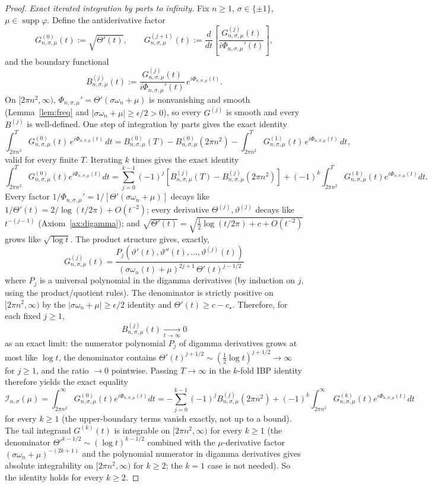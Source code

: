 \documentclass[11pt]{article}
\theoremstyle{definition}
\newcommand{\supp}{\operatorname{supp}}
\begin{document}
\begin{proof}
\emph{Exact iterated integration by parts to infinity.} Fix \(n\ge 1\), \(\sigma\in\{\pm 1\}\), \(\mu\in\supp\varphi\). Define the antiderivative factor
\[
G_{n,\sigma,\mu}^{(0)}(t):=\sqrt{\Theta'(t)},\qquad G_{n,\sigma,\mu}^{(j+1)}(t):=\frac{d}{dt}\!\left[\frac{G_{n,\sigma,\mu}^{(j)}(t)}{i\Phi_{n,\sigma,\mu}'(t)}\right],
\]
and the boundary functional
\[
B_{n,\sigma,\mu}^{(j)}(t):=\frac{G_{n,\sigma,\mu}^{(j)}(t)}{i\Phi_{n,\sigma,\mu}'(t)}\,e^{i\Phi_{n,\sigma,\mu}(t)}.
\]
On \([2\pi n^2,\infty)\), \(\Phi_{n,\sigma,\mu}'=\Theta'(\sigma\omega_n+\mu)\) is nonvanishing and smooth (Lemma~\ref{lem:freq} and \(|\sigma\omega_n+\mu|\ge\epsilon/2>0\)), so every \(G^{(j)}\) is smooth and every \(B^{(j)}\) is well-defined. One step of integration by parts gives the exact identity
\[
\int_{2\pi n^2}^T G_{n,\sigma,\mu}^{(0)}(t)\,e^{i\Phi_{n,\sigma,\mu}(t)}\,dt=B_{n,\sigma,\mu}^{(0)}(T)-B_{n,\sigma,\mu}^{(0)}(2\pi n^2)-\int_{2\pi n^2}^T G_{n,\sigma,\mu}^{(1)}(t)\,e^{i\Phi_{n,\sigma,\mu}(t)}\,dt,
\]
valid for every finite \(T\). Iterating \(k\) times gives the exact identity
\[
\int_{2\pi n^2}^T G_{n,\sigma,\mu}^{(0)}(t)e^{i\Phi_{n,\sigma,\mu}(t)}dt=\sum_{j=0}^{k-1}(-1)^j\!\left[B_{n,\sigma,\mu}^{(j)}(T)-B_{n,\sigma,\mu}^{(j)}(2\pi n^2)\right]+(-1)^k\!\int_{2\pi n^2}^T G_{n,\sigma,\mu}^{(k)}(t)e^{i\Phi_{n,\sigma,\mu}(t)}dt.
\]
Every factor \(1/\Phi_{n,\sigma,\mu}'=1/[\Theta'(\sigma\omega_n+\mu)]\) decays like \(1/\Theta'(t)=2/\log(t/2\pi)+O(t^{-2})\); every derivative \(\Theta^{(j)},\vartheta^{(j)}\) decays like \(t^{-(j-1)}\) (Axiom~\ref{ax:digamma}); and \(\sqrt{\Theta'(t)}=\sqrt{\tfrac12\log(t/2\pi)+c+O(t^{-2})}\) grows like \(\sqrt{\log t}\). The product structure gives, exactly,
\[
G_{n,\sigma,\mu}^{(j)}(t)=\frac{P_j(\vartheta'(t),\vartheta''(t),\ldots,\vartheta^{(j)}(t))}{(\sigma\omega_n(t)+\mu)^{2j+1}\,\Theta'(t)^{j-1/2}}
\]
where \(P_j\) is a universal polynomial in the digamma derivatives (by induction on \(j\), using the product/quotient rules). The denominator is strictly positive on \([2\pi n^2,\infty)\) by the \(|\sigma\omega_n+\mu|\ge\epsilon/2\) identity and \(\Theta'(t)\ge c-c_\star\). Therefore, for each fixed \(j\ge 1\),
\[
B_{n,\sigma,\mu}^{(j)}(t)\xrightarrow[t\to\infty]{}0
\]
as an exact limit: the numerator polynomial \(P_j\) of digamma derivatives grows at most like \(\log t\), the denominator contains \(\Theta'(t)^{j+1/2}\sim(\tfrac12\log t)^{j+1/2}\to\infty\) for \(j\ge 1\), and the ratio \(\to 0\) pointwise. Passing \(T\to\infty\) in the \(k\)-fold IBP identity therefore yields the exact equality
\[
\mathcal I_{n,\sigma}(\mu)=\int_{2\pi n^2}^\infty G_{n,\sigma,\mu}^{(0)}(t)e^{i\Phi_{n,\sigma,\mu}(t)}dt=-\sum_{j=0}^{k-1}(-1)^j B_{n,\sigma,\mu}^{(j)}(2\pi n^2)+(-1)^k\!\int_{2\pi n^2}^\infty G_{n,\sigma,\mu}^{(k)}(t)e^{i\Phi_{n,\sigma,\mu}(t)}dt
\]
for every \(k\ge 1\) (the upper-boundary terms vanish exactly, not up to a bound). The tail integrand \(G^{(k)}(t)\) is integrable on \([2\pi n^2,\infty)\) for every \(k\ge 1\) (the denominator \(\Theta'^{k-1/2}\sim(\log t)^{k-1/2}\) combined with the \(\mu\)-derivative factor \((\sigma\omega_n+\mu)^{-(2k+1)}\) and the polynomial numerator in digamma derivatives gives absolute integrability on \([2\pi n^2,\infty)\) for \(k\ge 2\); the \(k=1\) case is not needed). So the identity holds for every \(k\ge 2\).


\end{proof}
\end{document}
